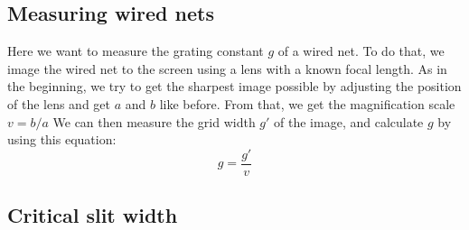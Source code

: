 \subsection{Measuring wired nets}
Here we want to measure the grating constant $g$ of a wired net.
To do that, we image the wired net to the screen using a lens with a known focal length.
As in the beginning, we try to get the sharpest image possible by adjusting the position of the lens and get $a$ and $b$ like before.
From that, we get the magnification scale $v = b/a$
We can then measure the grid width $g'$ of the image, and calculate $g$ by using this equation:
\begin{equation}
	g = \frac{g'}{v}
	\label{eq::grid}
\end{equation}

\subsection{Critical slit width}


